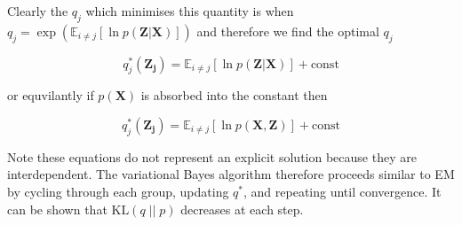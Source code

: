 \documentclass{article}
\begin{document}
Clearly the $q_j$ which minimises this quantity is when $q_j = \exp(\mathbb{E}_{i \ne j}[\ln p(\boldsymbol{Z} | \boldsymbol{X})])$ and therefore we find the optimal $q_j$

\begin{equation}
q^*_j(\boldsymbol{Z_j}) = \mathbb{E}_{i \ne j}[\ln p(\boldsymbol{Z} | \boldsymbol{X})] + \text{const}
\end{equation}

or equvilantly if $p(\boldsymbol{X})$ is absorbed into the constant then

\begin{equation}
\label{eq:q_opt}
q^*_j(\boldsymbol{Z_j}) = \mathbb{E}_{i \ne j}[\ln p(\boldsymbol{X}, \boldsymbol{Z})] + \text{const}
\end{equation}

Note these equations do not represent an explicit solution because they are interdependent. The variational Bayes algorithm therefore proceeds similar to EM by cycling through each group, updating $q^*$, and repeating until convergence. It can be shown that $\text{KL}(q\; ||\; p)$ decreases at each step.
\end{document}
